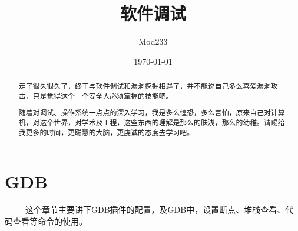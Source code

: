 \documentclass[12pt]{article}  %
\title{软件调试}
\author{Mod233}
\date{\today}
\begin{document}

\maketitle
\begin{abstract}
走了很久很久了，终于与软件调试和漏洞挖掘相遇了，并不能说自己多么喜爱漏洞攻击，只是觉得这个一个安全人必须掌握的技能吧。\par
随着对调试、操作系统一点点的深入学习，我是多么惶恐，多么害怕，原来自己对计算机，对这个世界，对学术及工程，这些东西的理解是那么的肤浅，那么的幼稚。请赐给我更多的时间，更聪慧的大脑，更虔诚的态度去学习吧。
\end{abstract}
\tableofcontents
\section{GDB} %
\ \ \ \ \ 这个章节主要讲下GDB插件的配置，及GDB中，设置断点、堆栈查看、代码查看等命令的使用。
\label{sec:熟悉latex}
\end{document}
